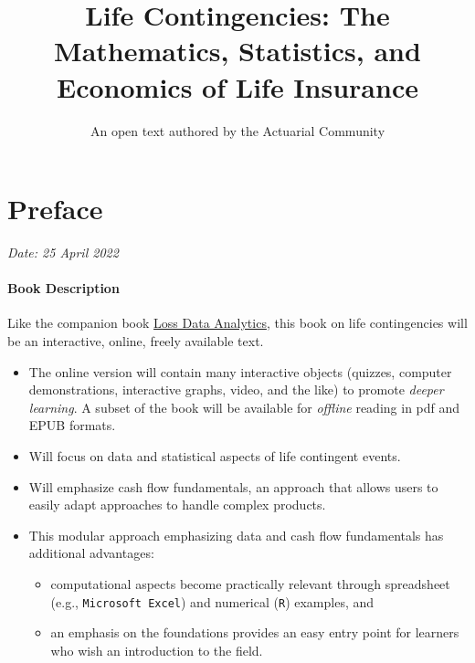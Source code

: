 \documentclass[
]{book}
\title{Life Contingencies: The Mathematics, Statistics, and Economics of Life Insurance}
\author{An open text authored by the Actuarial Community}
\date{}
\providecommand{\tightlist}{%
  \setlength{\itemsep}{0pt}\setlength{\parskip}{0pt}}
\let\oldmaketitle\maketitle
\begin{document}
\maketitle

\thispagestyle{empty}
%

\let\maketitle\oldmaketitle
\maketitle

{
\setcounter{tocdepth}{2}
\tableofcontents
}
\hypertarget{preface}{%
\chapter*{Preface}\label{preface}}

\emph{Date: 25 April 2022}

\hypertarget{book-description}{%
\subsubsection*{Book Description}\label{book-description}}

Like the companion book \href{https://openacttexts.github.io/Loss-Data-Analytics/index.html}{Loss Data Analytics}, this book on life contingencies will be an interactive, online, freely available text.

\begin{itemize}
\tightlist
\item
  The online version will contain many interactive objects (quizzes, computer demonstrations, interactive graphs, video, and the like) to promote \emph{deeper learning}. A subset of the book will be available for \emph{offline} reading in pdf and EPUB formats.
\item
  Will focus on data and statistical aspects of life contingent events.
\item
  Will emphasize cash flow fundamentals, an approach that allows users to easily adapt approaches to handle complex products.
\item
  This modular approach emphasizing data and cash flow fundamentals has additional advantages:

  \begin{itemize}
  \tightlist
  \item
    computational aspects become practically relevant through spreadsheet (e.g., \texttt{Microsoft\ Excel}) and numerical (\texttt{R}) examples, and
  \item
    an emphasis on the foundations provides an easy entry point for learners who wish an introduction to the field.
  \end{itemize}
\end{itemize}
\end{document}
